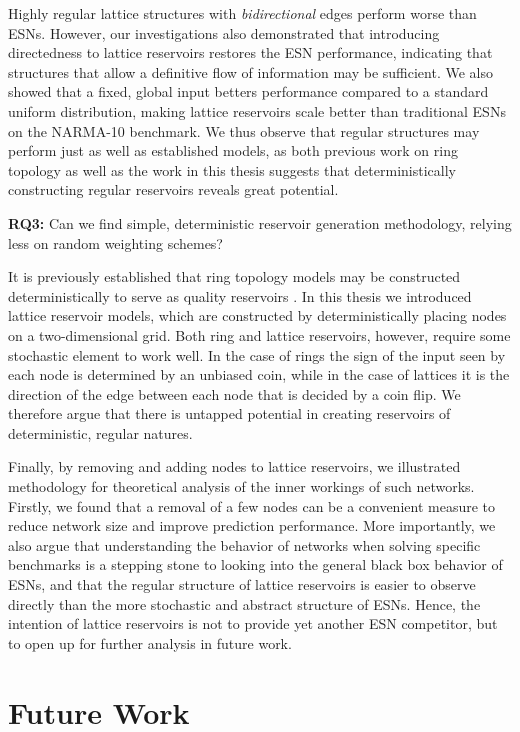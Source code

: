 Highly regular lattice structures with \textit{bidirectional} edges perform
worse than ESNs. However, our investigations also demonstrated that introducing
directedness to lattice reservoirs restores the ESN performance, indicating that
structures that allow a definitive flow of information may be sufficient. We
also showed that a fixed, global input betters performance compared to a
standard uniform distribution, making lattice reservoirs scale better than
traditional ESNs on the NARMA-10 benchmark. We thus observe that regular
structures may perform just as well as established models, as both previous work
on ring topology as well as the work in this thesis suggests that
deterministically constructing regular reservoirs reveals great potential.

\textbf{RQ3:} Can we find simple, deterministic reservoir generation
methodology, relying less on random weighting schemes?

It is previously established that ring topology models may be constructed
deterministically to serve as quality reservoirs \cite{rodan_minimum_2011}. In
this thesis we introduced lattice reservoir models, which are constructed by
deterministically placing nodes on a two-dimensional grid. Both ring and lattice
reservoirs, however, require some stochastic element to work well. In the case
of rings the sign of the input seen by each node is determined by an unbiased
coin, while in the case of lattices it is the direction of the edge between each
node that is decided by a coin flip. We therefore argue that there is untapped
potential in creating reservoirs of deterministic, regular natures.

Finally, by removing and adding nodes to lattice reservoirs, we illustrated
methodology for theoretical analysis of the inner workings of such
networks. Firstly, we found that a removal of a few nodes can be a convenient
measure to reduce network size and improve prediction performance. More
importantly, we also argue that understanding the behavior of networks when
solving specific benchmarks is a stepping stone to looking into the general
black box behavior of ESNs, and that the regular structure of lattice reservoirs
is easier to observe directly than the more stochastic and abstract structure of
ESNs. Hence, the intention of lattice reservoirs is not to provide yet another
ESN competitor, but to open up for further analysis in future work.

\section{Future Work}

